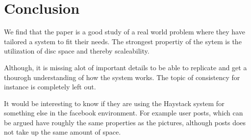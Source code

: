\section{Conclusion}
We find that the paper is a good study of a real world problem where they have tailored 
a system to fit their needs. The strongest propertiy of the sytem is the utilization of
disc space and thereby scaleability. 

Although, it is missing alot of important details to be able to replicate and get a
thourogh understanding of how the system works. The topic of consistency for instance
is completely left out.

It would be interesting to know if they are using the Haystack system for something else in
the facebook environment. For example user posts, which can be argued have roughly the 
same properties as the pictures, although posts does not take up the same amount of 
space.
